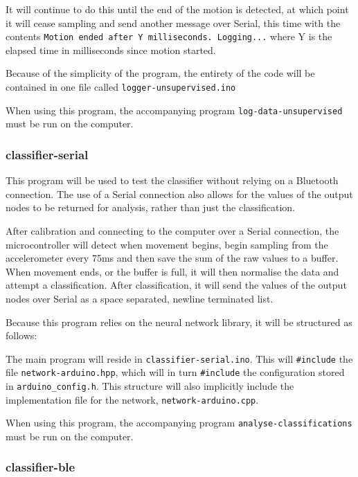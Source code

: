 \documentclass[a4paper]{article}
\begin{document}
It will continue to do this until the end of the motion is detected, at which point it will cease sampling and send another message over Serial, this time with the contents \lstinline{Motion ended after Y milliseconds. Logging...} where Y is the elapsed time in milliseconds since motion started.

Because of the simplicity of the program, the entirety of the code will be contained in one file called \lstinline{logger-unsupervised.ino}

When using this program, the accompanying program \lstinline{log-data-unsupervised} must be run on the computer. 

\subsubsection{classifier-serial}

This program will be used to test the classifier without relying on a Bluetooth connection. The use of a Serial connection also allows for the values of the output nodes to be returned for analysis, rather than just the classification.

After calibration and connecting to the computer over a Serial connection, the microcontroller will detect when movement begins, begin sampling from the accelerometer every 75ms and then save the sum of the raw values to a buffer. When movement ends, or the buffer is full, it will then normalise the data and attempt a classification. After classification, it will send the values of the output nodes over Serial as a space separated, newline terminated list.

Because this program relies on the neural network library, it will be structured as follows:

The main program will reside in \lstinline{classifier-serial.ino}. This will \lstinline{#include} the file \lstinline{network-arduino.hpp}, which will in turn \lstinline{#include} the configuration stored in \lstinline{arduino_config.h}. 
This structure will also implicitly include the implementation file for the network, \lstinline{network-arduino.cpp}.


When using this program, the accompanying program \lstinline{analyse-classifications} must be run on the computer. 

\subsubsection{classifier-ble}
\end{document}
